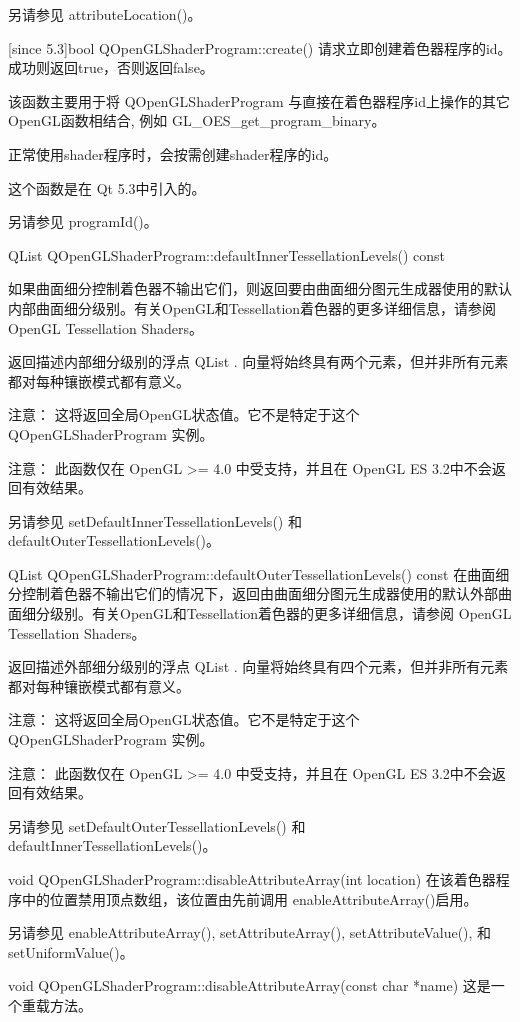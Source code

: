 另请参见 attributeLocation()。

[since 5.3]bool QOpenGLShaderProgram::create()
请求立即创建着色器程序的id。成功则返回true，否则返回false。

该函数主要用于将 QOpenGLShaderProgram 与直接在着色器程序id上操作的其它OpenGL函数相结合, 例如 GL\_OES\_get\_program\_binary。

正常使用shader程序时，会按需创建shader程序的id。

这个函数是在 Qt 5.3中引入的。

另请参见 programId()。

QList QOpenGLShaderProgram::defaultInnerTessellationLevels() const

如果曲面细分控制着色器不输出它们，则返回要由曲面细分图元生成器使用的默认内部曲面细分级别。有关OpenGL和Tessellation着色器的更多详细信息，请参阅 OpenGL Tessellation Shaders。

返回描述内部细分级别的浮点 QList . 向量将始终具有两个元素，但并非所有元素都对每种镶嵌模式都有意义。

注意： 这将返回全局OpenGL状态值。它不是特定于这个QOpenGLShaderProgram 实例。

注意： 此函数仅在 OpenGL >= 4.0 中受支持，并且在 OpenGL ES 3.2中不会返回有效结果。

另请参见 setDefaultInnerTessellationLevels() 和 defaultOuterTessellationLevels()。

QList QOpenGLShaderProgram::defaultOuterTessellationLevels() const
在曲面细分控制着色器不输出它们的情况下，返回由曲面细分图元生成器使用的默认外部曲面细分级别。有关OpenGL和Tessellation着色器的更多详细信息，请参阅 OpenGL Tessellation Shaders。

返回描述外部细分级别的浮点 QList . 向量将始终具有四个元素，但并非所有元素都对每种镶嵌模式都有意义。

注意： 这将返回全局OpenGL状态值。它不是特定于这个QOpenGLShaderProgram 实例。

注意： 此函数仅在 OpenGL >= 4.0 中受支持，并且在 OpenGL ES 3.2中不会返回有效结果。

另请参见 setDefaultOuterTessellationLevels() 和 defaultInnerTessellationLevels()。

void QOpenGLShaderProgram::disableAttributeArray(int location)
在该着色器程序中的位置禁用顶点数组，该位置由先前调用 enableAttributeArray()启用。

另请参见 enableAttributeArray(), setAttributeArray(), setAttributeValue(), 和 setUniformValue()。

void QOpenGLShaderProgram::disableAttributeArray(const char *name)
这是一个重载方法。

